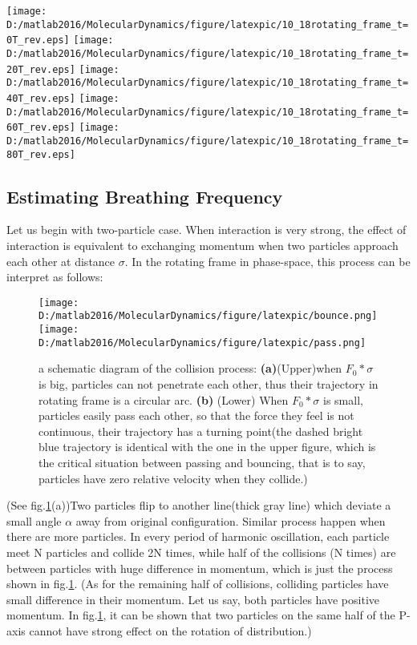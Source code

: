 \documentclass[aps,pre,twocolumn,groupedaddress]{revtex4-1}
\begin{document}
\begin{figure*}
\texttt{[image: D:/matlab2016/MolecularDynamics/figure/latexpic/10\_18rotating\_frame\_t=0T\_rev.eps]} 
\texttt{[image: D:/matlab2016/MolecularDynamics/figure/latexpic/10\_18rotating\_frame\_t=20T\_rev.eps]}
\texttt{[image: D:/matlab2016/MolecularDynamics/figure/latexpic/10\_18rotating\_frame\_t=40T\_rev.eps]} 
\texttt{[image: D:/matlab2016/MolecularDynamics/figure/latexpic/10\_18rotating\_frame\_t=60T\_rev.eps]}
\texttt{[image: D:/matlab2016/MolecularDynamics/figure/latexpic/10\_18rotating\_frame\_t=80T\_rev.eps]} 
\caption{the precession behaviour of cloud viewed in the rotating frame in phase-space. $\frac{t}{T}=0,20,40,60,80$}
\label{fig:Breathingfrequency2_1}
\end{figure*}



\subsection{Estimating Breathing Frequency}
Let us begin with two-particle case. When interaction is very strong, the effect of interaction is equivalent to exchanging momentum when two particles approach each other at distance $\sigma$. In the rotating frame in phase-space, this process can be interpret as follows:

\begin{figure}
\centering
\texttt{[image: D:/matlab2016/MolecularDynamics/figure/latexpic/bounce.png]}
\texttt{[image: D:/matlab2016/MolecularDynamics/figure/latexpic/pass.png]}
\caption{a schematic diagram of the collision process: \textbf{(a)}(Upper)when $F_0*\sigma$ is big, particles can not penetrate each other, thus their trajectory in rotating frame is a circular arc.  \textbf{(b)} (Lower) When $F_0*\sigma$ is small, particles easily pass each other, so that the force they feel is not continuous, their trajectory has a turning point(the dashed bright blue trajectory is identical with the one in the upper figure, which is the critical situation between passing and bouncing, that is to say, particles have zero relative velocity when they collide.) }
\label{fig:Breathingfrequency3}
\end{figure}


(See fig.\ref{fig:Breathingfrequency3}(a))Two particles flip to another line(thick gray line) which deviate a small angle $\alpha$ away from original configuration. Similar process happen when there are more particles. In every period of harmonic oscillation, each particle meet N particles and collide 2N times, while half of the collisions (N times) are between particles with huge difference in momentum, which is just the process shown in fig.\ref{fig:Breathingfrequency3}. (As for the remaining half of collisions, colliding particles have small difference in their momentum. Let us say, both particles have positive momentum. In fig.\ref{fig:Breathingfrequency3}, it can be shown that two particles on the same half of the P-axis cannot have strong effect on the rotation of distribution.)
\end{document}

